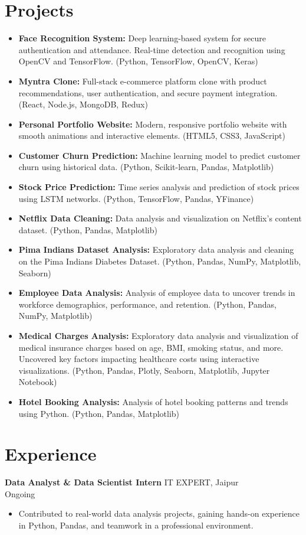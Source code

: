 \documentclass[11pt,a4paper]{article}
\begin{document}
\section*{Projects}
\begin{itemize}[leftmargin=*]
    \item \textbf{Face Recognition System:} Deep learning-based system for secure authentication and attendance. Real-time detection and recognition using OpenCV and TensorFlow. (Python, TensorFlow, OpenCV, Keras)
    \item \textbf{Myntra Clone:} Full-stack e-commerce platform clone with product recommendations, user authentication, and secure payment integration. (React, Node.js, MongoDB, Redux)
    \item \textbf{Personal Portfolio Website:} Modern, responsive portfolio website with smooth animations and interactive elements. (HTML5, CSS3, JavaScript)
    \item \textbf{Customer Churn Prediction:} Machine learning model to predict customer churn using historical data. (Python, Scikit-learn, Pandas, Matplotlib)
    \item \textbf{Stock Price Prediction:} Time series analysis and prediction of stock prices using LSTM networks. (Python, TensorFlow, Pandas, YFinance)
    \item \textbf{Netflix Data Cleaning:} Data analysis and visualization on Netflix's content dataset. (Python, Pandas, Matplotlib)
    \item \textbf{Pima Indians Dataset Analysis:} Exploratory data analysis and cleaning on the Pima Indians Diabetes Dataset. (Python, Pandas, NumPy, Matplotlib, Seaborn)
    \item \textbf{Employee Data Analysis:} Analysis of employee data to uncover trends in workforce demographics, performance, and retention. (Python, Pandas, NumPy, Matplotlib)
    \item \textbf{Medical Charges Analysis:} Exploratory data analysis and visualization of medical insurance charges based on age, BMI, smoking status, and more. Uncovered key factors impacting healthcare costs using interactive visualizations. (Python, Pandas, Plotly, Seaborn, Matplotlib, Jupyter Notebook)
    \item \textbf{Hotel Booking Analysis:} Analysis of hotel booking patterns and trends using Python. (Python, Pandas, Matplotlib)
\end{itemize}

\section*{Experience}
\textbf{Data Analyst \& Data Scientist Intern} \hfill IT EXPERT, Jaipur \\Ongoing
\begin{itemize}[leftmargin=*]
    \item Contributed to real-world data analysis projects, gaining hands-on experience in Python, Pandas, and teamwork in a professional environment.
\end{itemize}
\end{document}
